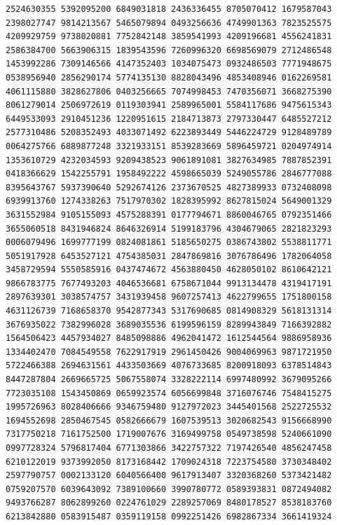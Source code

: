 \begin{Verbatim}[fontsize=\fontsize{6.4}{7.3}\selectfont]
2524630355 5392095200 6849031818 2436336455 8705070412 1679587043 2398027747 9814213567 5465079894 0493256636 4749901363 7823525575
4209929759 9738020881 7752842148 3859541993 4209196681 4556241831 2586384700 5663906315 1839543596 7260996320 6698569079 2712486548
1453992286 7309146566 4147352403 1034075473 0932486503 7771948675 0538956940 2856290174 5774135130 8828043496 4853408946 0162269581
4061115880 3828627806 0403256665 7074998453 7470356071 3668275390 8061279014 2506972619 0119303941 2589965001 5584117686 9475615343
6449533093 2910451236 1220951615 2184713873 2797330447 6485527212 2577310486 5208352493 4033071492 6223893449 5446224729 9128489789
0064275766 6889877248 3321933151 8539283669 5896459721 0204974914 1353610729 4232034593 9209438523 9061891081 3827634985 7887852391
0418366629 1542255791 1958492222 4598665039 5249055786 2846777088 8395643767 5937390640 5292674126 2373670525 4827389933 0732408098
6939913760 1274338263 7517970302 1828395992 8627815024 5649001329 3631552984 9105155093 4575288391 0177794671 8860046765 0792351466
3655060518 8431946824 8646326914 5199183796 4304679065 2821823293 0006079496 1699777199 0824081861 5185650275 0386743802 5538811771
5051917928 6453527121 4754385031 2847869816 3076786496 1782064058 3458729594 5550585916 0437474672 4563880450 4628050102 8610642121
9866783775 7677493203 4046536681 6758671044 9913134478 4319417191 2897639301 3038574757 3431939458 9607257413 4622799655 1751800158
4631126739 7168658370 9542877343 5317690685 0814908329 5618131314 3676935022 7382996028 3689035536 6199596159 8289943849 7166392882
1564506423 4457934027 8485098886 4962041472 1612544564 9886958936 1334402470 7084549558 7622917919 2961450426 9004069963 9871721950
5722466388 2694631561 4433503669 4076733685 8200918093 6378514843 8447287804 2669665725 5067558074 3328222114 6997480992 3679095266
7723035108 1543450869 0659923574 6056699848 3716076746 7548415275 1995726963 8028406666 9346759480 9127972023 3445401568 2522725532
1694552698 2850467545 0582666679 1607539513 3020682543 9156668990 7317750218 7161752500 1719007676 3169499758 0549738598 5240661090
0997728324 5796817404 6771303866 3422757322 7197426540 4856247458 6210122019 9373992050 8173168442 1709024318 7223754580 3730348402
2597790757 0002133120 6040566400 9617913407 3320368260 5373421482 0759207570 6039643092 7389100660 3990780772 0589393831 0872494082
9493766287 8062899260 0224761029 2289257069 8480178527 8538183760 6213842880 0583915487 0359119158 0992251426 6982867334 3661419324

\end{Verbatim}
